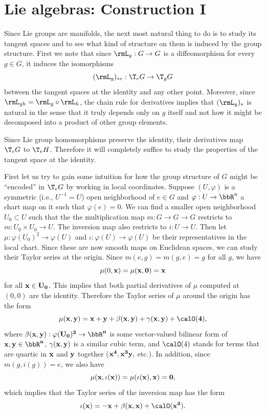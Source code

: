 \section{Lie algebras: Construction I}

Since Lie groups are manifolds, the next most natural thing to do is to study its tangent spaces and to see what kind of structure on them is induced by the group structure. 
First we note that since $\rmL_g:G\to G$ is a diffeomorphism for every $g\in G$, it induces the isomorphisms
\[(\rmL_g)_{\ast e}: \T_e G\to \T_g G\]
between the tangent spaces at the identity and any other point. Moreover, since $\rmL_{gh}=\rmL_g\circ \rmL_h$, the chain rule for derivatives implies that $(\rmL_g)_\ast$ is natural in the sense that it truly depends only on $g$ itself and not how it might be decomposed into a product of other group elements.

Since Lie group homomorphisms preserve the identity, their derivatives map $\T_e G$ to $\T_eH$. Therefore it will completely suffice to study the properties of the tangent space at the identity.


First let us try to gain some intuition for how the group structure of $G$ might be ``encoded'' in $\T_e G$ by working in local coordinates. Suppose $(U,\varphi)$ is a symmetric (i.e., $U^{-1}=U$) open neighborhood of $e\in G$ and $\varphi:U\to \bbR^n$ a chart map on it such that $\varphi(e)=0$. We can find a smaller open neighborhood $U_0\subset U$ such that the the multiplication map $m:G\to G\to G$ restricts to $m:U_0\times U_0\to U$. The inversion map also restricts to $i:U\to U$. Then let $\mu:\varphi (U_0)^2\to \varphi(U)$ and $\iota:\varphi(U)\to \varphi(U)$ be their representatives in the local chart. Since these are now smooth maps on Euclidean spaces, we can study their Taylor series at the origin. Since $m(e,g)=m(g,e)=g$ for all $g$, we have
\[\mu(0,\bf{x})=\mu(\bf{x},0)=\bf{x}\]
for all $\bf{x}\in U_0$. This implies that both partial derivatives of $\mu$ computed at $(0,0)$ are the identity. Therefore the Taylor series of $\mu$ around the origin has the form
\[\mu(\bf{x},\bf{y})=\bf{x}+\bf{y}+\beta(\bf{x},\bf{y})+\gamma(\bf{x},\bf{y})+\calO(4),\]
where $\beta(\bf{x},\bf{y}):\varphi(U_0)^2\to \bbR^n$ is some vector-valued bilinear form of $\bf{x},\bf{y}\in\bbR^n$, $\gamma(\bf{x},\bf{y})$ is a similar cubic term, and $\calO(4)$ stands for terms that are quartic in $\bf{x}$ and $\bf{y}$ together ($\bf{x}^4, \bf{x}^3 \bf{y},$ etc.). In addition, since $m(g,i(g))=e$, we also have
\[\mu(\bf{x},\iota(\bf{x}))=\mu(\iota(\bf{x}),\bf{x})=0,\]
which implies that the Taylor series of the inversion map has the form
\[\iota(\bf{x})=-\bf{x}+\beta(\bf{x},\bf{x})+\calO(\bf{x}^3).\]

